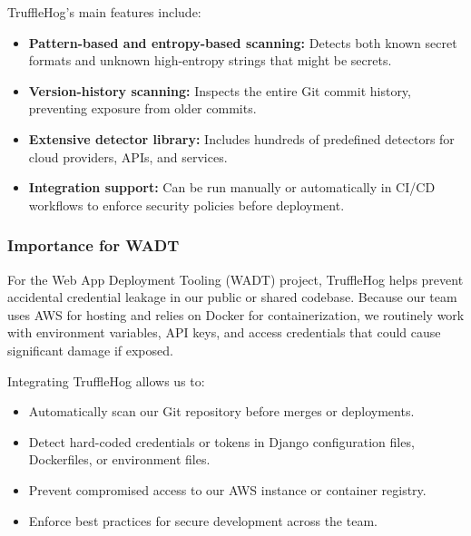 \documentclass[12pt]{article}
\begin{document}
TruffleHog’s main features include:
\begin{itemize}
    \item \textbf{Pattern-based and entropy-based scanning:} Detects both known secret formats and unknown high-entropy strings that might be secrets. 
    \item \textbf{Version-history scanning:} Inspects the entire Git commit history, preventing exposure from older commits.
    \item \textbf{Extensive detector library:} Includes hundreds of predefined detectors for cloud providers, APIs, and services.
    \item \textbf{Integration support:} Can be run manually or automatically in CI/CD workflows to enforce security policies before deployment.
\end{itemize}

\subsubsection{Importance for WADT}
For the Web App Deployment Tooling (WADT) project, TruffleHog helps prevent accidental credential leakage in our public or shared codebase. Because our team uses AWS for hosting and relies on Docker for containerization, we routinely work with environment variables, API keys, and access credentials that could cause significant damage if exposed.

Integrating TruffleHog allows us to:
\begin{itemize}
    \item Automatically scan our Git repository before merges or deployments.
    \item Detect hard-coded credentials or tokens in Django configuration files, Dockerfiles, or environment files.
    \item Prevent compromised access to our AWS instance or container registry.
    \item Enforce best practices for secure development across the team.
\end{itemize}
\end{document}
